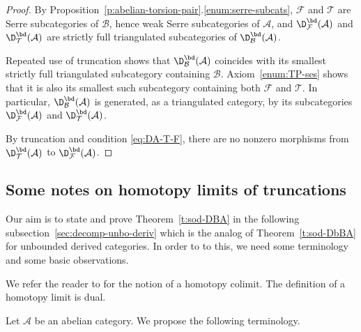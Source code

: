 \begin{proof}
  By Proposition~\ref{p:abelian-torsion-pair}.\ref{enum:serre-subcats},
  $\mathcal{F}$ and $\mathcal{T}$ are Serre
  subcategories of $\mathcal{B}$, hence weak Serre
  subcategories of $\mathcal{A}$, and 
  $\D_{\mathcal{F}}^\bd(\mathcal{A})$ and  
  $\D_{\mathcal{T}}^\bd(\mathcal{A})$ are strictly full triangulated
  subcategories of $\D_\mathcal{B}^\bd(\mathcal{A})$.

  Repeated use of truncation shows that 
  $\D_{\mathcal{B}}^\bd(\mathcal{A})$ coincides with its smallest strictly
  full triangulated subcategory containing $\mathcal{B}$.
  Axiom~\ref{enum:TP-ses} shows that it is
  also its smallest such subcategory containing both
  $\mathcal{F}$ and $\mathcal{T}$.
  In particular, $\D_{\mathcal{B}}^\bd(\mathcal{A})$ is generated,
  as a triangulated category, by its subcategories
  $\D_{\mathcal{F}}^\bd(\mathcal{A})$ 
  and $\D_{\mathcal{T}}^\bd(\mathcal{A})$.

  By truncation and condition \eqref{eq:DA-T-F},
  there are no nonzero morphisms from 
  $\D_{\mathcal{T}}^\bd(\mathcal{A})$ to 
  $\D_{\mathcal{F}}^\bd(\mathcal{A})$.
\end{proof}
 
\subsection{Some notes on homotopy limits of truncations}
\label{sec:notes-htpy-limits}

Our aim is to state and prove Theorem~\ref{t:sod-DBA} 
in the following subsection~\ref{sec:decomp-unbo-deriv}
which is
the analog  
of Theorem~\ref{t:sod-DbBA} for unbounded
derived categories. In order to to this, 
we need some terminology and some basic observations.

We refer the reader to
\cite[Definition~1.6.4]{neeman-tricat} for the notion of a
homotopy colimit. The definition of a homotopy limit is dual.

Let $\mathcal{A}$ be an abelian category.
We propose the following terminology. 


